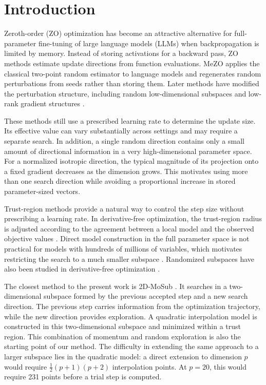 \documentclass[smallextended]{svjour3}
\begin{document}
\section{Introduction}
\label{sec:intro}

Zeroth-order (ZO) optimization has become an attractive alternative for full-parameter fine-tuning of large language models (LLMs) when backpropagation is limited by memory. Instead of storing activations for a backward pass, ZO methods estimate update directions from function evaluations. MeZO \cite{malladi2023mezo} applies the classical two-point random estimator \cite{nesterov2017random} to language models and regenerates random perturbations from seeds rather than storing them. Later methods have modified the perturbation structure, including random low-dimensional subspaces \cite{yu2024subzero} and low-rank gradient structures \cite{chen2024enhancing}.

These methods still use a prescribed learning rate to determine the update size. Its effective value can vary substantially across settings and may require a separate search. In addition, a single random direction contains only a small amount of directional information in a very high-dimensional parameter space. For a normalized isotropic direction, the typical magnitude of its projection onto a fixed gradient decreases as the dimension grows. This motivates using more than one search direction while avoiding a proportional increase in stored parameter-sized vectors.

Trust-region methods provide a natural way to control the step size without prescribing a learning rate. In derivative-free optimization, the trust-region radius is adjusted according to the agreement between a local model and the observed objective values \cite{audet2017derivative,conn2009introduction,conn2000trust,Conn2009a}. Direct model construction in the full parameter space is not practical for models with hundreds of millions of variables, which motivates restricting the search to a much smaller subspace \cite{cartis2023scalable,yuan2007subspace,yuan2014review}. Randomized subspaces have also been studied in derivative-free optimization \cite{cartis2024randomizedsubspacederivativefreeoptimization,kozak2021stochastic,Menickelly2023}.

The closest method to the present work is 2D-MoSub \cite{xie2023twodimensional}. It searches in a two-dimensional subspace formed by the previous accepted step and a new search direction. The previous step carries information from the optimization trajectory, while the new direction provides exploration. A quadratic interpolation model is constructed in this two-dimensional subspace and minimized within a trust region. This combination of momentum and random exploration is also the starting point of our method. The difficulty in extending the same approach to a larger subspace lies in the quadratic model: a direct extension to dimension $p$ would require $\frac{1}{2}(p+1)(p+2)$ interpolation points. At $p=20$, this would require 231 points before a trial step is computed.
\end{document}
